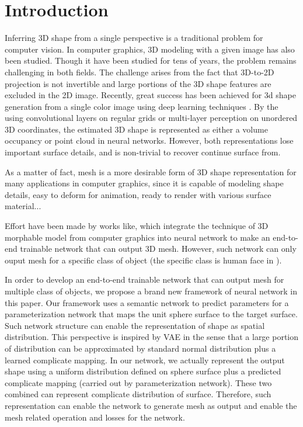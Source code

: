  \section{Introduction}
Inferring 3D shape from a single perspective is a traditional problem for computer vision.  In computer graphics, 3D modeling with a given image has also been studied. Though it have been studied for tens of years, the problem remains challenging in both fields. The challenge arises from the fact that 3D-to-2D projection is not invertible and large portions of the 3D shape features are excluded in the 2D image. Recently, great success has been achieved for 3d shape generation from a single color image using deep learning techniques
\cite{3DR2N2,PSGN}. By the using convolutional layers on regular grids or multi-layer
perception on unordered 3D coordinates, the estimated 3D shape is represented
as either a volume occupancy \cite{3DR2N2} or point cloud \cite{PSGN} in neural networks. However, both representations lose important
surface details, and is non-trivial to recover continue surface from.

As a matter of fact, mesh is a more desirable form of 3D shape representation for many applications in computer graphics, since it is capable of
modeling shape details, easy to deform for animation, ready to render with various surface material...


Effort have been made by works like\cite{endface}, which integrate the technique of 3D morphable model from computer graphics into neural network to make an end-to-end trainable network that can output 3D mesh. However, such network can only ouput mesh for a specific class of object (the specific class is human face in \cite{endface}).

In order to develop an end-to-end trainable network that can output mesh for multiple class of objects, we propose a brand new framework of neural network in this paper. Our framework uses a semantic network to predict parameters for a parameterization network that maps the unit sphere surface to the target surface. Such network structure can enable the representation of shape as spatial distribution. This perspective is inspired by VAE\cite{VAE} in the sense that a large portion of distribution can be approximated by standard normal distribution plus a learned complicate mapping. In our network, we actually represent the output shape using a uniform distribution defined on sphere surface plus a predicted complicate mapping (carried out by parameterization network). These two combined can represent complicate distribution of surface. Therefore, such representation can enable the network to generate mesh as output and enable the mesh related operation and losses for the network.



